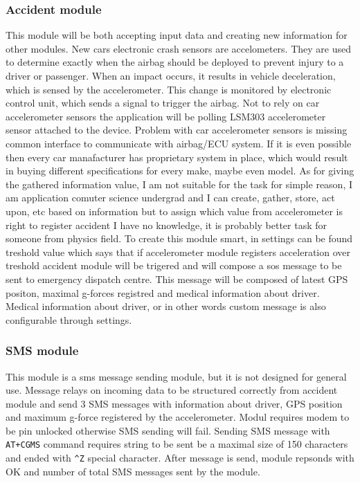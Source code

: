 \subsubsection{Accident module} %
\label{ssub:accident_module}
This module will be both accepting input data and creating new information for other modules. New cars electronic crash sensors are accelometers. They are used to determine exactly when the airbag should be deployed to prevent injury to a driver or passenger.   When an impact occurs, it results in vehicle deceleration, which is sensed by the accelerometer. This change is monitored by electronic control unit, which sends a signal to trigger the airbag. Not to rely on car accelerometer sensors the application will be polling LSM303 accelerometer sensor attached to the device. Problem with car accelerometer sensors is missing common interface to communicate with airbag/ECU system. If it is even possible then every car manafacturer has proprietary system in place, which would result in buying different specifications for every make, maybe even model. As for giving the gathered information value, I am not suitable for the task for simple reason, I am application comuter science undergrad and I can create, gather, store, act upon, etc based on information but to assign which value from accelerometer is right to register accident I have no knowledge, it is probably better task for someone from physics field. To create this module smart, in settings can be found treshold value which says that if accelerometer module registers acceleration over treshold accident module will be trigered and will compose a sos message to be sent to emergency dispatch centre. This message will be composed of latest GPS positon, maximal g-forces registred and medical information about driver. Medical information about driver, or in other words custom message is also configurable through settings.
\subsubsection{SMS module} %
\label{ssub:sms_module}
This module is a sms message sending module, but it is not designed for general use. Message relays on incoming data to be structured correctly from accident module and send 3 SMS messages with information about driver, GPS position and maximum g-force registered by the accelerometer. Modul requires modem to be pin unlocked otherwise SMS sending will fail. Sending SMS message with \verb|AT+CGMS| command requires string to be sent be a maximal size of 150 characters and ended with \verb|^Z| special character. After message is send, module repsonds with OK and number of total SMS messages sent by the module.
